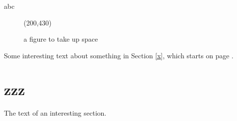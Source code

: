 \documentclass{article}
\begin{document}
a\clearpage b\clearpage c\clearpage

\begin{figure}[!t]
\framebox(200,430){}
\caption{a figure to take up space}
\end{figure}


Some interesting text about  something in Section \ref{x},
which starts on page \pageref{x}.

\section{zzz\label{x}}
The text of an interesting section.
\end{document}
